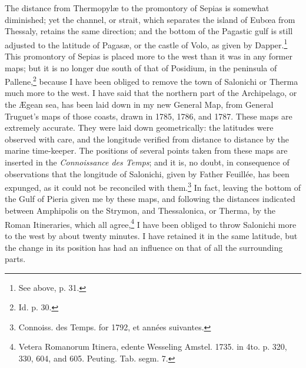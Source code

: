 \documentclass[a4paper, 11pt, oneside, polutonikogreek, english]{article}
\begin{document}
The distance from Thermopylæ to the promontory of Sepias is somewhat diminished; yet the channel, or strait, which separates the island of Eubœa from Thessaly, retains the same direction; and the bottom of the Pagastic gulf is still adjusted to the latitude of Pagasæ, or the castle of Volo, as given by Dapper.\footnote{See above, p. 31.} This promontory of Sepias is placed more to the west than it was in any former maps; but it is no longer due south of that of Posidium, in the peninsula of Pallene,\footnote{Id. p. 30.} because I have been obliged to remove the town of Salonichi or Therma much more to the west. I have said that the northern part of the Archipelago, or the Ægean sea, has been laid down in my new General Map, from General Truguet's maps of those coasts, drawn in 1785, 1786, and 1787. These maps are extremely accurate. They were laid down geometrically: the latitudes were observed with care, and the longitude verified from distance to distance by the marine time-keeper. The positions of several points taken from these maps are inserted in the \emph{Connoissance des Temps}; and it is, no doubt, in consequence of observations that the longitude of Salonichi, given by Father Feuillée, has been expunged, as it could not be reconciled with them.\footnote{Connoiss. des Temps. for 1792, et années suivantes.} In fact, leaving the bottom of the Gulf of Pieria given me by these maps, and following the distances indicated between Amphipolis on the Strymon, and Thessalonica, or Therma, by the Roman Itineraries, which all agree,\footnote{Vetera Romanorum Itinera, edente Wesseling Amstel. 1735. in 4to. p. 320, 330, 604, and 605. Peuting. Tab. segm. 7.} I have been obliged to throw Salonichi more to the west by about twenty minutes. I have retained it in the same latitude, but the change in its position has had an influence on that of all the surrounding parts.
\end{document}
